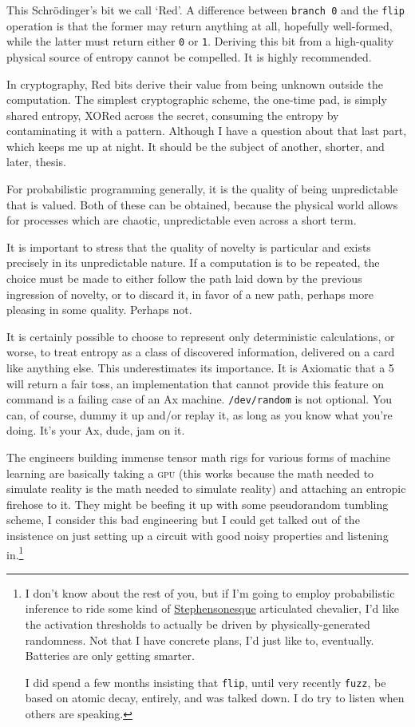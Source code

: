 \documentclass[twoside]{article}
\begin{document}
This Schrödinger's bit we call `Red'. A difference between \texttt{branch 0} and the \texttt{flip} operation is that the former may return anything at all, hopefully well-formed, while the latter must return either \texttt{0} or \texttt{1}. Deriving this bit from a high-quality physical source of entropy cannot be compelled. It is highly recommended.

In cryptography, Red bits derive their value from being unknown outside the computation. The simplest cryptographic scheme, the one-time pad, is simply shared entropy, XORed across the secret, consuming the entropy by contaminating it with a pattern. Although I have a question about that last part, which keeps me up at night. It should be the subject of another, shorter, and later, thesis.

For probabilistic programming generally, it is the quality of being unpredictable that is valued. Both of these can be obtained, because the physical world allows for processes which are chaotic, unpredictable even across a short term.

It is important to stress that the quality of novelty is particular and exists precisely in its unpredictable nature. If a computation is to be repeated, the choice must be made to either follow the path laid down by the previous ingression of novelty, or to discard it, in favor of a new path, perhaps more pleasing in some quality. Perhaps not.

It is certainly possible to choose to represent only deterministic calculations, or worse, to treat entropy as a class of discovered information, delivered on a card like anything else. This underestimates its importance. It is Axiomatic that a 5 will return a fair toss, an implementation that cannot provide this feature on command is a failing case of an Ax machine. \texttt{/dev/random} is not optional. You can, of course, dummy it up and/or replay it, as long as you know what you're doing. It's your Ax, dude, jam on it.

The engineers building immense tensor math rigs for various forms of machine learning are basically taking a \textsc{gpu} (this works because the math needed to simulate reality is the math needed to simulate reality) and attaching an entropic firehose to it. They might be beefing it up with some pseudorandom tumbling scheme, I consider this bad engineering but I could get talked out of the insistence on just setting up a circuit with good noisy properties and listening in.\footnote{I don't know about the rest of you, but if I'm going to employ probabilistic inference to ride some kind of \href{https://en.wikipedia.org/wiki/The_Diamond_Age}{Stephensonesque} articulated chevalier, I'd like the activation thresholds to actually be driven by physically-generated randomness. Not that I have concrete plans, I'd just like to, eventually. Batteries are only getting smarter.

I did spend a few months insisting that \texttt{flip}, until very recently \texttt{fuzz}, be based on atomic decay, entirely, and was talked down. I do try to listen when others are speaking.}
\end{document}
